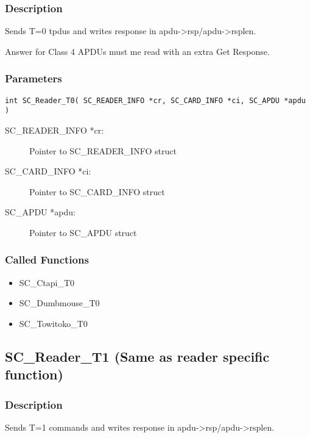 \documentclass[a4paper,oneside]{article}
\begin{document}
\subsubsection*{Description}

Sends T=0 tpdus and writes response in apdu->rsp/apdu->rsplen.

Answer for Class 4 APDUs must me read with an extra Get Response.

\subsubsection*{Parameters}

\begin{verbatim}
int SC_Reader_T0( SC_READER_INFO *cr, SC_CARD_INFO *ci, SC_APDU *apdu )
\end{verbatim}

\begin{description}
\item[SC\_READER\_INFO *cr:] Pointer to SC\_READER\_INFO struct
\item[SC\_CARD\_INFO *ci:] Pointer to SC\_CARD\_INFO struct
\item[SC\_APDU *apdu:] Pointer to SC\_APDU struct
\end{description}

\subsubsection*{Called Functions}

\begin{itemize}
\item SC\_Ctapi\_T0
\item SC\_Dumbmouse\_T0
\item SC\_Towitoko\_T0
\end{itemize}


\subsection{SC\_Reader\_T1 (Same as reader specific function)}

\subsubsection*{Description}

Sends T=1 commands and writes response in apdu->rsp/apdu->rsplen.
\end{document}

